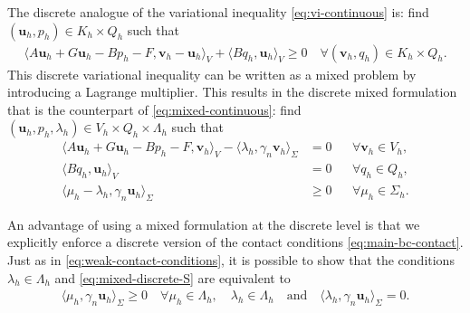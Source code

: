 \documentclass[onefignum,onetabnum]{siamart190516}
\newcommand{\bu}{\boldsymbol{u}}
\newcommand{\bv}{\boldsymbol{v}}
\begin{document}
The discrete analogue of the variational inequality \eqref{eq:vi-continuous} is: find $(\bu_h,p_h)\in K_h\times Q_h$ such that
%
\begin{align}\label{eq:vi-discrete}
	\langle A\bu_h + G\bu_h - Bp_h - F, \bv_h - \bu_h \rangle_V + \langle Bq_h, \bu_h \rangle_V \geq  0 \quad \forall (\bv_h,q_h)\in K_h\times Q_h.
\end{align}
%
This discrete variational inequality can be written as a mixed problem by introducing a Lagrange multiplier. This results in the discrete mixed formulation that is the counterpart of \eqref{eq:mixed-continuous}: find $(\bu_h,p_h,\lambda_h)\in V_h\times Q_h\times \Lambda_h$ such that
%
\begin{subequations}\label{eq:mixed-discrete}
\begin{align}
	\langle A\bu_h + G\bu_h - Bp_h - F, \bv_h \rangle_V  - \langle \lambda_h, \gamma_n \bv_h\rangle_\Sigma &= 0 && \forall \bv_h \in V_h, \label{eq:mixed-discrete-V}\\
	 \langle Bq_h, \bu_h \rangle_V &= 0 && \forall q_h \in Q_h, \\
	\langle \mu_h - \lambda_h, \gamma_n \bu_h\rangle_\Sigma &\geq 0 && \forall \mu_h \in \Sigma_h. \label{eq:mixed-discrete-S}
\end{align}
\end{subequations}

An advantage of using a mixed formulation at the discrete level is that we explicitly enforce a discrete version of the contact conditions \eqref{eq:main-bc-contact}. Just as in \eqref{eq:weak-contact-conditions}, it is possible to show that the conditions $\lambda_h\in\Lambda_h$ and \eqref{eq:mixed-discrete-S} are equivalent to
%
\begin{align}\label{eq:discrete-contact-conditions}
	\langle \mu_h, \gamma_n\bu_h\rangle_\Sigma \geq 0 \quad \forall \mu_h\in\Lambda_h, \quad \lambda_h\in\Lambda_h \quad \text{and} \quad \langle \lambda_h, \gamma_n\bu_h \rangle_\Sigma = 0.
\end{align}
%
\end{document}
